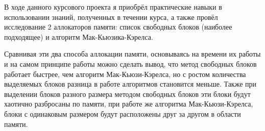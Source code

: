 \documentclass[a4paper, 12pt]{article}
\begin{document}
В ходе данного курсового проекта я приобрёл практические навыки в использовании знаний,
полученных в течении курса, а также провёл исследование 2 аллокаторов памяти: 
список свободных блоков (наиболее подходящее) и алгоритм Мак-Кьюзика-Кэрелса.

Сравнивая эти два способа аллокации памяти, основываясь на времени их работы и 
на самом принципе работы можно сделать вывод, что метод свободных блоков работает быстрее, чем 
алгоритм Мак-Кьюзи-Кэрелса, но с ростом количества выделяемых блоков разница в работе алгоритмов становится меньше.
Также при выделении блоков разного размера методом свободных блоков эти блоки будут хаотично разбросаны по памяти, 
при работе же алгоритма Мак-Кьюзи-Кэрелса, блоки с одинаковым размером будут расположены друг за другом в области памяти.
\end{document}
